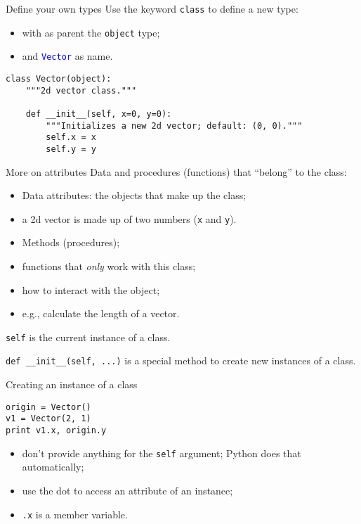 \documentclass{beamer}
\begin{document}
\begin{frame}[fragile]{Define your own types}
Use the keyword \texttt{class} to define a new type:
\begin{itemize}
\item with as parent the \texttt{object} type;
\item and \textcolor{blue}{\texttt{Vector}} as name.
\end{itemize}

\bigskip

\begin{verbatim}
class Vector(object):
    """2d vector class."""

    def __init__(self, x=0, y=0):
        """Initializes a new 2d vector; default: (0, 0)."""
        self.x = x
        self.y = y
\end{verbatim}
\end{frame}

\begin{frame}{More on attributes}
Data and procedures (functions) that ``belong'' to the class:

\begin{itemize}
\item \textcolor{pms280_compl}{Data} attributes: the objects that make up
the class;
\item a 2d vector is made up of two numbers (\texttt{x} and
\texttt{y}).
\item \textcolor{pms280_compl}{Methods} (procedures);
\item functions that \emph{only} work with this class;
\item how to interact with the object;
\item e.g., calculate the length of a vector.
\end{itemize}

\bigskip

\texttt{self} is the current instance of a class.

\bigskip

\texttt{def __init__(self, ...)} is a special method to
create new instances of a class.
\end{frame}

\begin{frame}[fragile]{Creating an instance of a class}
\begin{verbatim}
origin = Vector()
v1 = Vector(2, 1)
print v1.x, origin.y
\end{verbatim}

\bigskip

\begin{itemize}
\item don't provide anything for the \texttt{self} argument;
Python does that automatically;
\item use the \textcolor{pms280_compl}{dot} to access an attribute of an
instance;
\item \texttt{.x} is a member variable.
\end{itemize}
\end{frame}
\end{document}

